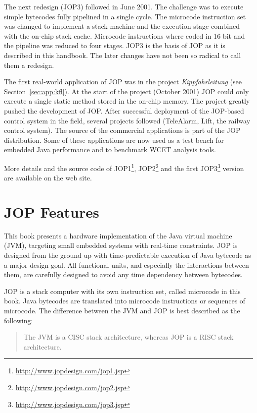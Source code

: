 The next redesign (JOP3) followed in June 2001. The challenge was to
execute simple bytecodes fully pipelined in a single cycle. The
microcode instruction set was changed to implement a stack machine
and the execution stage combined with the on-chip stack cache.
Microcode instructions where coded in 16 bit and the pipeline was
reduced to four stages. JOP3 is the basis of JOP as it is described
in this handbook. The later changes have not been so radical to call
them a redesign.

The first real-world application of JOP was in the project
\emph{Kippfahrleitung} (see Section~\ref{sec:app:kfl}). At the start
of the project (October 2001) JOP could only execute a single static
method stored in the on-chip memory. The project greatly pushed the
development of JOP. After successful deployment of the JOP-based
control system in the field, several projects followed (TeleAlarm,
Lift, the railway control system). The source of the commercial
applications is part of the JOP distribution. Some of these
applications are now used as a test bench for embedded Java
performance and to benchmark WCET analysis tools.

More details and the source code of
JOP1\footnote{\url{http://www.jopdesign.com/jop1.jsp}},
JOP2\footnote{\url{http://www.jopdesign.com/jop2.jsp}} and the first
JOP3\footnote{\url{http://www.jopdesign.com/jop3.jsp}} version are
available on the web site.


\section{JOP Features}

This book presents a hardware implementation of the Java virtual
machine (JVM), targeting small embedded systems with real-time
constraints. JOP is designed from the ground up with time-predictable
execution of Java bytecode as a major design goal. All functional
units, and especially the interactions between them, are carefully
designed to avoid any time dependency between bytecodes.

JOP is a stack computer with its own instruction set, called
microcode in this book. Java bytecodes are translated into microcode
instructions or sequences of microcode. The difference between the
JVM and JOP is best described as the following:
\begin{quote}
The JVM is a CISC stack architecture, whereas JOP is a RISC stack
architecture.
\end{quote}

